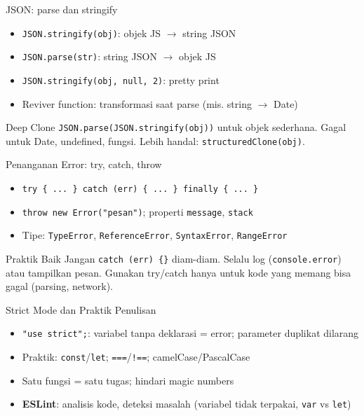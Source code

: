 \documentclass[handout]{beamer}
\begin{document}
\begin{frame}{JSON: parse dan stringify}
	\begin{itemize}
		\item \texttt{JSON.stringify(obj)}: objek JS $\to$ string JSON
		\item \texttt{JSON.parse(str)}: string JSON $\to$ objek JS
		\item \texttt{JSON.stringify(obj, null, 2)}: pretty print
		\item Reviver function: transformasi saat parse (mis. string $\to$ Date)
	\end{itemize}
	\begin{block}{Deep Clone}
		\texttt{JSON.parse(JSON.stringify(obj))} untuk objek sederhana. Gagal untuk Date, undefined, fungsi. Lebih handal: \texttt{structuredClone(obj)}.
	\end{block}
\end{frame}

\begin{frame}{Penanganan Error: try, catch, throw}
	\begin{itemize}
		\item \texttt{try \{ ... \} catch (err) \{ ... \} finally \{ ... \}}
		\item \texttt{throw new Error("pesan")}; properti \texttt{message}, \texttt{stack}
		\item Tipe: \texttt{TypeError}, \texttt{ReferenceError}, \texttt{SyntaxError}, \texttt{RangeError}
	\end{itemize}
	\begin{block}{Praktik Baik}
		Jangan \texttt{catch (err) \{\}} diam-diam. Selalu log (\texttt{console.error}) atau tampilkan pesan. Gunakan try/catch hanya untuk kode yang memang bisa gagal (parsing, network).
	\end{block}
\end{frame}

\begin{frame}{Strict Mode dan Praktik Penulisan}
	\begin{itemize}
		\item \texttt{"use strict";}: variabel tanpa deklarasi = error; parameter duplikat dilarang
		\item Praktik: \texttt{const}/\texttt{let}; \texttt{===}/\texttt{!==}; camelCase/PascalCase
		\item Satu fungsi = satu tugas; hindari magic numbers
		\item \textbf{ESLint}: analisis kode, deteksi masalah (variabel tidak terpakai, \texttt{var} vs \texttt{let})
	\end{itemize}
\end{frame}
\end{document}
